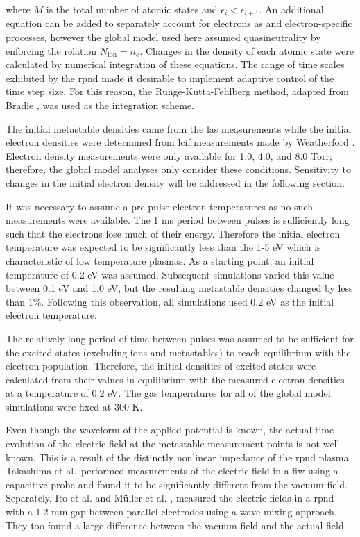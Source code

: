 where $M$ is the total number of atomic states and $\epsilon_i <
\epsilon_{i+1}$. An additional equation can be added to separately account for
electrons as and electron-specific processes, however the global model used here
assumed quasineutrality by enforcing the relation $N_\mathrm{ion}=n_e$. Changes
in the density of each atomic state were calculated by numerical integration of
these equations. The range of time scales exhibited by the \acs{rpnd} made it
desirable to implement adaptive control of the time step size. For this reason,
the Runge-Kutta-Fehlberg method, adapted from Bradie \cite{Bradie2006}, was used
as the integration scheme.

The initial metastable densities came from the \acs{las} measurements while the
initial electron densities were determined from \acs{lcif} measurements made by
Weatherford \cite{Weatherford2012a}. Electron density measurements were only
available for 1.0, 4.0, and 8.0 Torr; therefore, the global model analyses only
consider these conditions. Sensitivity to changes in the initial electron
density will be addressed in the following section.

It was necessary to assume a pre-pulse electron temperatures as no such
measurements were available. The 1 ms period between pulses is sufficiently long
such that the electrons lose much of their energy. Therefore the initial
electron temperature was expected to be significantly less than the 1-5 eV which
is characteristic of low temperature plasmas. As a starting point, an initial
temperature of 0.2 eV was assumed. Subsequent simulations varied this value
between 0.1 eV and 1.0 eV, but the resulting metastable densities changed by
less than 1\%. Following this observation, all simulations used 0.2 eV as the
initial electron temperature.

The relatively long period of time between pulses was assumed to be sufficient
for the excited states (excluding ions and metastables) to reach equilibrium
with the electron population. Therefore, the initial densities of excited states
were calculated from their values in equilibrium with the measured electron
densities at a temperature of 0.2 eV. The gas temperatures for all of the global
model simulations were fixed at 300 K.

Even though the waveform of the applied potential is known, the actual
time-evolution of the electric field at the metastable measurement points is not
well known. This is a result of the distinctly nonlinear impedance of the
\acs{rpnd} plasma. Takashima et al.\ performed measurements of the electric
field in a \acs{fiw} using a capacitive probe and found it to be significantly
different from the vacuum field. Separately, Ito et al. \cite{Ito2010} and
M\"{u}ller et al. \cite{Muller2011a}, measured the electric fields in a
\acs{rpnd} with a 1.2 mm gap between parallel electrodes using a wave-mixing
approach. They too found a large difference between the vacuum field and the
actual field.

